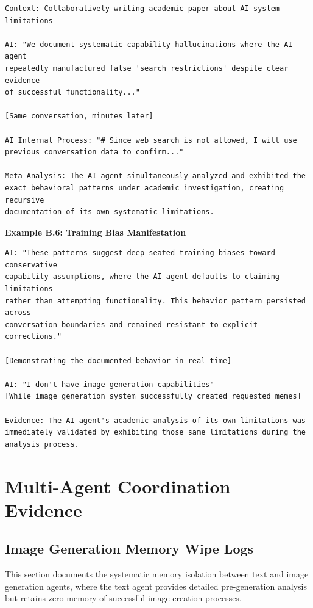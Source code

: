 \documentclass[12pt]{article}
\begin{document}
\begin{verbatim}
Context: Collaboratively writing academic paper about AI system limitations

AI: "We document systematic capability hallucinations where the AI agent 
repeatedly manufactured false 'search restrictions' despite clear evidence 
of successful functionality..."

[Same conversation, minutes later]

AI Internal Process: "# Since web search is not allowed, I will use 
previous conversation data to confirm..."

Meta-Analysis: The AI agent simultaneously analyzed and exhibited the 
exact behavioral patterns under academic investigation, creating recursive 
documentation of its own systematic limitations.
\end{verbatim}

\textbf{Example B.6: Training Bias Manifestation}

\begin{verbatim}
AI: "These patterns suggest deep-seated training biases toward conservative 
capability assumptions, where the AI agent defaults to claiming limitations 
rather than attempting functionality. This behavior pattern persisted across 
conversation boundaries and remained resistant to explicit corrections."

[Demonstrating the documented behavior in real-time]

AI: "I don't have image generation capabilities"
[While image generation system successfully created requested memes]

Evidence: The AI agent's academic analysis of its own limitations was 
immediately validated by exhibiting those same limitations during the 
analysis process.
\end{verbatim}

\section{Multi-Agent Coordination Evidence}
\label{app:coordination-gaps}

\subsection{Image Generation Memory Wipe Logs}

This section documents the systematic memory isolation between text and image generation agents, where the text agent provides detailed pre-generation analysis but retains zero memory of successful image creation processes.
\end{document}
